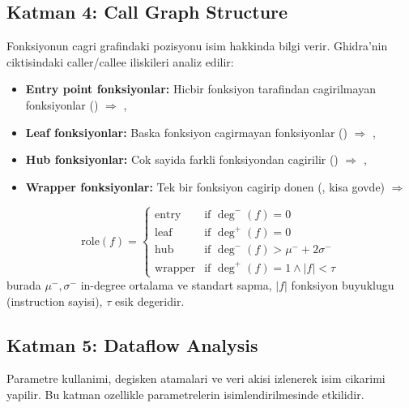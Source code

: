 \subsection{Katman 4: Call Graph Structure}
\label{subsec:layer4-callgraph}

Fonksiyonun cagri grafindaki pozisyonu isim hakkinda bilgi verir.
Ghidra'nin  ciktisindaki caller/callee iliskileri
analiz edilir:

\begin{itemize}
  \item \textbf{Entry point fonksiyonlar:} Hicbir fonksiyon tarafindan
        cagirilmayan fonksiyonlar () $\Rightarrow$ , 
  \item \textbf{Leaf fonksiyonlar:} Baska fonksiyon cagirmayan fonksiyonlar
        () $\Rightarrow$ , 
  \item \textbf{Hub fonksiyonlar:} Cok sayida farkli fonksiyondan cagirilir
        () $\Rightarrow$ , 
  \item \textbf{Wrapper fonksiyonlar:} Tek bir fonksiyon cagirip donen
        (, kisa govde) $\Rightarrow$ 
\end{itemize}

\begin{equation}
  \text{role}(f) = \begin{cases}
    \text{entry} & \text{if } \deg^-(f) = 0 \\
    \text{leaf} & \text{if } \deg^+(f) = 0 \\
    \text{hub} & \text{if } \deg^-(f) > \mu^- + 2\sigma^- \\
    \text{wrapper} & \text{if } \deg^+(f) = 1 \wedge |f| < \tau
  \end{cases}
  \label{eq:callgraph-role}
\end{equation}
burada $\mu^-, \sigma^-$ in-degree ortalama ve standart sapma,
$|f|$ fonksiyon buyuklugu (instruction sayisi), $\tau$ esik degeridir.


\subsection{Katman 5: Dataflow Analysis}
\label{subsec:layer5-dataflow}

Parametre kullanimi, degisken atamalari ve veri akisi izlenerek isim cikarimi yapilir.
Bu katman ozellikle parametrelerin isimlendirilmesinde etkilidir.

